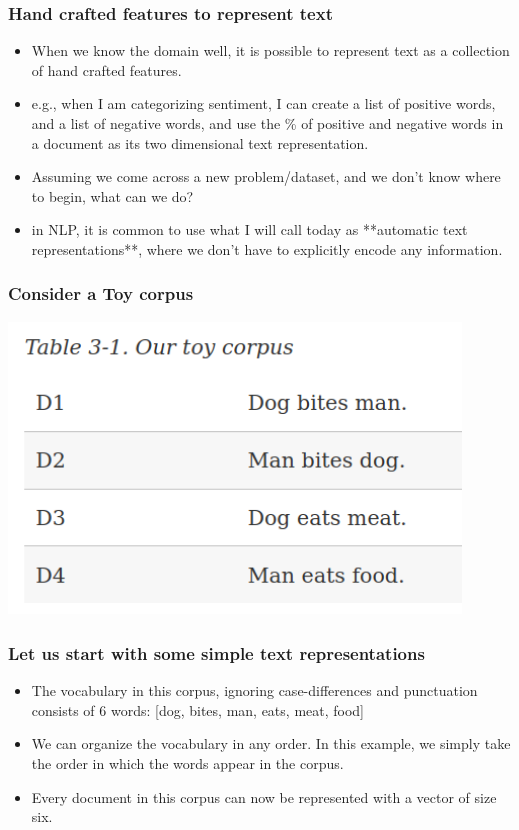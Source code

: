 \documentclass{beamer}
\begin{document}
\begin{frame}
\frametitle{Hand crafted features to represent text}
\begin{itemize}
\item When we know the domain well, it is possible to represent text as a collection of hand crafted features.
\item e.g., when I am categorizing sentiment, I can create a list of positive words, and a list of negative words, and use the \% of positive and negative words in a document as its two dimensional text representation. 
\item Assuming we come across a new problem/dataset, and we don't know where to begin, what can we do? \pause
\item in NLP, it is common to use what I will call today as **automatic text representations**, where we don't have to explicitly encode any information. 
\end{itemize}
\end{frame}

\begin{frame}
\frametitle{Consider a Toy corpus}
\includegraphics[width=0.9\textwidth]{figures/toycorpus.png}
\end{frame}

\begin{frame}
\frametitle{Let us start with some simple text representations}
\begin{itemize}
\item The vocabulary in this corpus, ignoring case-differences and punctuation consists of 6 words: [dog, bites, man, eats, meat, food]
\item We can organize the vocabulary in any order. In this example, we simply take the order in which the words appear in the corpus.
\item Every document in this corpus can now be represented with a vector of size six.  
\end{itemize}
\end{frame}
\end{document}
